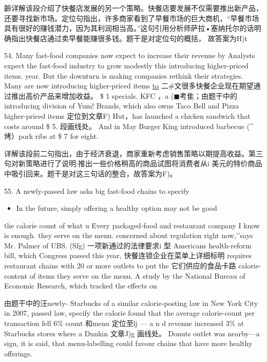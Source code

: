 \documentclass[UTF8,11pt]{ctexart}
\begin{document}
齡详解该段介绍了快餐店发展的另一个策略。快餐店要发展不仅需要推出新产品，还要寻找新市场。定位句指出，许多商家看到了早餐市场的巨大商机，“早餐市场具有很好的赚钱潜力，因为其利润相当高。”这句引用分析师萨拉•塞纳托尔的话明确指出快餐店通过卖早餐能赚很多钱。题干是对定位句的概括， 故答案为H)t


54. Many fast-food companies now expect to increase their revenue by Analysts expect the fast-food industry to grow modestly this introducing higher-priced items. year. But the downturn is making companies rethink their strategies. Many are now introducing higher-priced items \uline{to} 二\#文很多快餐企业现在期望通过推出高价产品来增加收益。  \$ 1 specials. KFC ，a (\(\blacksquare\)考隹；由题干中的introducing division of Yum! Brands, which also owns Taco Bell and Pizza higher-priced items 定位到文章F) Hut，has launched a chicken sandwich that costs around \$ 5. 段画线处。 And in May Burger King introduced barbecue (\textasciicircum{} 烤）pork ribs at \$ 7 for eight.


详解该段前二句指出，由于经济衰退，商家重新考虑销售策略以期提高收益。第三句对新策略进行了说明:推出一些价格稍高的商品试图将消费者从i 美元的特价商品中吸引回来。题干是对这三句话的整合，故答案为F)。


55. A newly-passed law asks big fast-food chains to specify


\begin{itemize}[leftmargin=2em,itemsep=.2em,topsep=.4em]\item[J.] In the future, simply offering a healthy option may not be good
\end{itemize}

the calorie count of what u Every packaged-food and restaurant company I know is enough. they serve on the menu. concerned about regulation right now,’’says Mr. Palmer of UBS. (Sfg) 一项新通过的法律要求i 型 Americans health-reform bill, which Congress passed this year, 快餐连锁企业在菜单上详细标明 requires restaurant chains with 20 or more outlets to put the 它们供应的食品卡路 calorie-content of items they serve on the menu. A study by the National Bureau of Economic Research, which tracked the effects on


由题干中的汪newly- Starbucks of a similar calorie-posting law in New York City in 2007, passed law, specify the calorie found that the average calorie-count per transaction fell 6\% count 和menu 定位至lj — a n d revenue increased 3\% at Starbucks stores where a Dunkin 文章J)g 画线处。 Donuts outlet was nearby—a sign, it is said, that menu-labelling could favour chains that have more healthy offerings.
\end{document}
